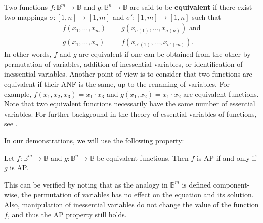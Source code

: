 Two functions $f\colon \mathbb{B}^m\to \mathbb{B}$ and $g\colon \mathbb{B}^n\to
\mathbb{B}$ are said to be {\bf equivalent} if there exist two mappings
$\sigma\colon
[1,n]\to [1,m]$ and $\sigma'\colon [1,m]\to [1,n]$ such that
\begin{align*}
  f(x_1,\ldots , x_m)&=g(x_{\sigma(1)},\ldots,x_{\sigma(n)}) \text{ and} \\
   g(x_1,\ldots , x_n)&=f(x_{\sigma'(1)},\ldots,x_{\sigma'(m)}).
\end{align*}
In other words, $f$ and $g$ are equivalent if one can be obtained from the
other by permutation of variables, addition of inessential variables, or
identification of inessential variables. Another point of view is to consider
that two functions are equivalent if their ANF is the same, up to the
renaming of variables. For example, $f(x_1, x_2, x_3) = x_1
\cdot x_3$ and $g(x_1, x_2)  = x_1 \cdot x_2$ are equivalent functions. Note
that two equivalent functions necessarily have the same number of essential
variables. For further background in the theory of essential variables of
functions, see \cite{CouceiroTCS08, CouceiroDM09, SalomaaAASF63, WillardDM96}.

In our demonstrations, we will use the following property:

\begin{property}\label{equivalent_functions}
Let $f\colon \mathbb{B}^m\to \mathbb{B}$ and $g\colon \mathbb{B}^n\to
  \mathbb{B}$ be equivalent functions. Then $f$ is AP if and only if $g$ is AP.
\end{property}

This can be verified by noting that as the analogy in $\mathbb{B}^m$ is defined
component-wise, the permutation of variables has no effect on the equation and
its solution. Also, manipulation of inessential variables do not change the
value of the function $f$, and thus the AP property still holds.

